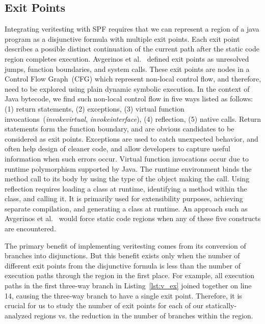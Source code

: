 \subsection{Exit Points}
%
Integrating veritesting with SPF requires that we can represent a region of a java program as a disjunctive formula with multiple exit points.  Each exit point describes a possible distinct continuation of the current path after the static code region completes execution.  Avgerinos et al.~\cite{veritesting} defined exit points as unresolved jumps, function boundaries, and system calls.
%
These exit points are nodes in a Control Flow Graph~(CFG) which represent non-local control flow, and therefore, need to be explored using plain dynamic symbolic execution.
%
In the context of Java bytecode, we find such non-local control flow in five ways listed as follows: (1) return statements, (2) exceptions, (3) virtual function invocations~(\textit{invokevirtual}, \textit{invokeinterface}), (4) reflection, (5) native calls.
%
Return statements form the function boundary, and are obvious candidates to be considered as exit points.
%
Exceptions are used to catch unexpected behavior, and often help design of cleaner code, and allow developers to capture useful information when such errors occur.
%
Virtual function invocations occur due to runtime polymorphism supported by Java.
%
The runtime environment binds the method call to its body by using the type of the object making the call.
%
Using reflection requires loading a class at runtime, identifying a method within the class, and calling it.
%
It is primarily used for extensibility purposes, achieving separate compilation, and generating a class at runtime.
%
An approach such as Avgerinos et al.~\cite{veritesting} would force
static code regions when any of these five constructs are encountered.

%
The primary benefit of implementing veritesting comes from its conversion of branches into disjunctions.
%
But this benefit exists only when the number of different exit points from the disjunctive formula is less than the number of execution paths through the region in the first place.
%
For example, all execution paths in the first three-way branch in
Listing~\ref{lst:v_ex} joined together on line 14, causing the three-way branch to have a single exit point.
%
Therefore, it is crucial for us to study the number of exit points for each of our statically-analyzed regions vs. the reduction in the number of branches within the region.
%
%
%

